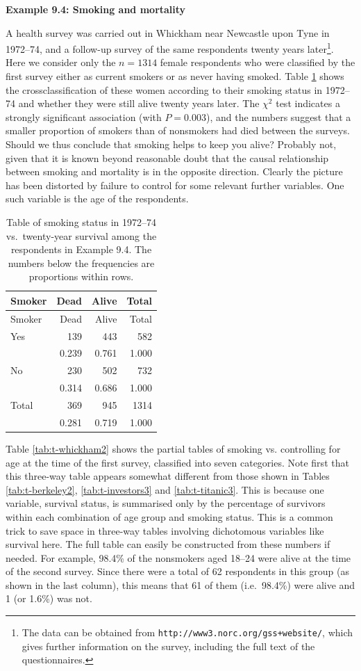 \documentclass[11pt,a4paper,openany]{book}
\let\rmarkdownfootnote\footnote%
\def\footnote{\protect\rmarkdownfootnote}
\begin{document}
\textbf{Example 9.4: Smoking and mortality}

A health survey was carried out in Whickham near Newcastle upon Tyne in
1972--74, and a follow-up survey of the same respondents twenty years
later\footnote{The data can be obtained from
  \texttt{http://www3.norc.org/gss+website/}, which gives further
  information on the survey, including the full text of the
  questionnaires.}. Here we consider only the \(n=1314\) female
respondents who were classified by the first survey either as current
smokers or as never having smoked. Table \ref{tab:t-whickham1} shows the
crossclassification of these women according to their smoking status in
1972--74 and whether they were still alive twenty years later. The
\(\chi^{2}\) test indicates a strongly significant association (with
\(P=0.003\)), and the numbers suggest that a smaller proportion of
smokers than of nonsmokers had died between the surveys. Should we thus
conclude that smoking helps to keep you alive? Probably not, given that
it is known beyond reasonable doubt that the causal relationship between
smoking and mortality is in the opposite direction. Clearly the picture
has been distorted by failure to control for some relevant further
variables. One such variable is the age of the respondents.

\begin{longtable}[]{@{}lrrr@{}}
\caption{\label{tab:t-whickham1} Table of smoking status in 1972--74
vs.~twenty-year survival among the respondents in Example 9.4. The
numbers below the frequencies are proportions within
rows.}\tabularnewline
\toprule
Smoker & Dead & Alive & Total\tabularnewline
\midrule
\endfirsthead
\toprule
Smoker & Dead & Alive & Total\tabularnewline
\midrule
\endhead
Yes & 139 & 443 & 582\tabularnewline
& 0.239 & 0.761 & 1.000\tabularnewline
No & 230 & 502 & 732\tabularnewline
& 0.314 & 0.686 & 1.000\tabularnewline
Total & 369 & 945 & 1314\tabularnewline
& 0.281 & 0.719 & 1.000\tabularnewline
\bottomrule
\end{longtable}

Table \ref{tab:t-whickham2} shows the partial tables of smoking
vs.\survival
controlling for age at the time of the first survey, classified into
seven categories. Note first that this three-way table appears somewhat
different from those shown in Tables \ref{tab:t-berkeley2},
\ref{tab:t-investors3} and \ref{tab:t-titanic3}. This is because one
variable, survival status, is summarised only by the percentage of
survivors within each combination of age group and smoking status. This
is a common trick to save space in three-way tables involving
dichotomous variables like survival here. The full table can easily be
constructed from these numbers if needed. For example, 98.4\% of the
nonsmokers aged 18--24 were alive at the time of the second survey.
Since there were a total of 62 respondents in this group (as shown in
the last column), this means that 61 of them (i.e.~98.4\%) were alive
and 1 (or 1.6\%) was not.
\end{document}
